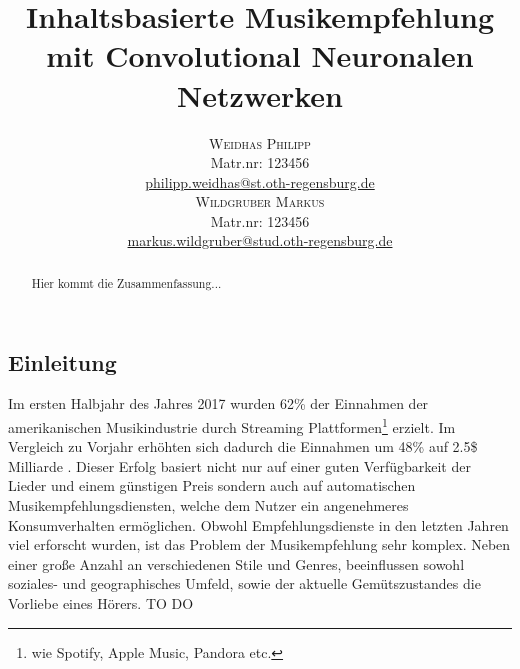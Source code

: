 \documentclass[twosided,a4,10pt]{article}
\title{\vspace{-5mm}%
	\fontsize{20pt}{10pt}\selectfont
	\textbf{Inhaltsbasierte Musikempfehlung mit Convolutional Neuronalen Netzwerken}
}
\author{
	\large\begin{minipage}[t]{0.5\linewidth}
		\begin{center}
			\textsc{Weidhas Philipp}\\[2mm]
			\normalsize	Matr.nr: 123456\\
			\normalsize
			\href{mailto:philipp.weidhas@st.oth-regensburg.de}
			{philipp.weidhas@st.oth-regensburg.de}
		\end{center}
	\end{minipage}
	\begin{minipage}[t]{0.5\linewidth}
		\begin{center}
			\textsc{Wildgruber Markus}\\[2mm]
			\normalsize	Matr.nr: 123456\\
			\normalsize
			\href{mailto:markus.wildgruber@stud.oth-regensburg.de}
			{markus.wildgruber@stud.oth-regensburg.de}
		\end{center}
	\end{minipage}
}
\begin{document}
	
	\maketitle
	\thispagestyle{fancy}
	
	
	
	\begin{multicols}{2}
		
		\begin{abstract}
			\noindent Hier kommt die Zusammenfassung...
		\end{abstract}
		
		
		\section{Einleitung}
		
		Im ersten Halbjahr des Jahres 2017 wurden 62\% der Einnahmen der amerikanischen Musikindustrie durch Streaming Plattformen\footnote[1]{wie Spotify, Apple Music, Pandora etc.} erzielt. Im Vergleich zu Vorjahr erhöhten sich dadurch die Einnahmen um 48\% auf 2.5\$ Milliarde \cite{friedlander}. Dieser Erfolg basiert nicht nur auf einer guten Verfügbarkeit der Lieder und einem günstigen Preis sondern auch auf automatischen Musikempfehlungsdiensten, welche dem Nutzer ein angenehmeres Konsumverhalten ermöglichen.\newline
		Obwohl Empfehlungsdienste in den letzten Jahren viel erforscht wurden, ist das Problem der Musikempfehlung sehr komplex. Neben einer große Anzahl an verschiedenen Stile und Genres, beeinflussen sowohl soziales- und geographisches Umfeld, sowie der aktuelle Gemütszustandes die Vorliebe eines Hörers. \cite{oord}\newline
		TO DO \newline\\
		

\end{multicols}
\end{document}
